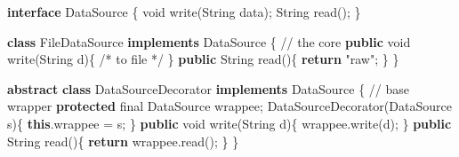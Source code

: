 \documentclass[11pt]{article}
\newenvironment{Shaded}{\begin{snugshade}}{\end{snugshade}}
\newcommand{\BuiltInTok}[1]{\textcolor[rgb]{0.50,0.55,0.55}{#1}}
\newcommand{\CommentTok}[1]{\textcolor[rgb]{0.48,0.49,0.49}{#1}}
\newcommand{\ControlFlowTok}[1]{\textcolor[rgb]{0.99,0.74,0.29}{\textbf{#1}}}
\newcommand{\DataTypeTok}[1]{\textcolor[rgb]{0.16,0.50,0.73}{#1}}
\newcommand{\FunctionTok}[1]{\textcolor[rgb]{0.56,0.27,0.68}{#1}}
\newcommand{\KeywordTok}[1]{\textcolor[rgb]{0.81,0.81,0.76}{\textbf{#1}}}
\newcommand{\NormalTok}[1]{\textcolor[rgb]{0.81,0.81,0.76}{#1}}
\newcommand{\OperatorTok}[1]{\textcolor[rgb]{0.81,0.81,0.76}{#1}}
\newcommand{\StringTok}[1]{\textcolor[rgb]{0.96,0.31,0.31}{#1}}
\begin{document}
\begin{Shaded}
\begin{Highlighting}[]
\KeywordTok{interface} \BuiltInTok{DataSource} \OperatorTok{\{} \DataTypeTok{void} \FunctionTok{write}\OperatorTok{(}\BuiltInTok{String}\NormalTok{ data}\OperatorTok{);} \BuiltInTok{String} \FunctionTok{read}\OperatorTok{();} \OperatorTok{\}}

\KeywordTok{class} \BuiltInTok{FileDataSource} \KeywordTok{implements} \BuiltInTok{DataSource} \OperatorTok{\{}                 \CommentTok{// the core}
    \KeywordTok{public} \DataTypeTok{void} \FunctionTok{write}\OperatorTok{(}\BuiltInTok{String}\NormalTok{ d}\OperatorTok{)\{} \CommentTok{/* to file */} \OperatorTok{\}}
    \KeywordTok{public} \BuiltInTok{String} \FunctionTok{read}\OperatorTok{()\{} \ControlFlowTok{return} \StringTok{"raw"}\OperatorTok{;} \OperatorTok{\}}
\OperatorTok{\}}

\KeywordTok{abstract} \KeywordTok{class}\NormalTok{ DataSourceDecorator }\KeywordTok{implements} \BuiltInTok{DataSource} \OperatorTok{\{}   \CommentTok{// base wrapper}
    \KeywordTok{protected} \DataTypeTok{final} \BuiltInTok{DataSource}\NormalTok{ wrappee}\OperatorTok{;}
    \FunctionTok{DataSourceDecorator}\OperatorTok{(}\BuiltInTok{DataSource}\NormalTok{ s}\OperatorTok{)\{} \KeywordTok{this}\OperatorTok{.}\FunctionTok{wrappee} \OperatorTok{=}\NormalTok{ s}\OperatorTok{;} \OperatorTok{\}}
    \KeywordTok{public} \DataTypeTok{void} \FunctionTok{write}\OperatorTok{(}\BuiltInTok{String}\NormalTok{ d}\OperatorTok{)\{}\NormalTok{ wrappee}\OperatorTok{.}\FunctionTok{write}\OperatorTok{(}\NormalTok{d}\OperatorTok{);} \OperatorTok{\}}
    \KeywordTok{public} \BuiltInTok{String} \FunctionTok{read}\OperatorTok{()\{} \ControlFlowTok{return}\NormalTok{ wrappee}\OperatorTok{.}\FunctionTok{read}\OperatorTok{();} \OperatorTok{\}}
\OperatorTok{\}}


\end{Highlighting}
\end{Shaded}
\end{document}
